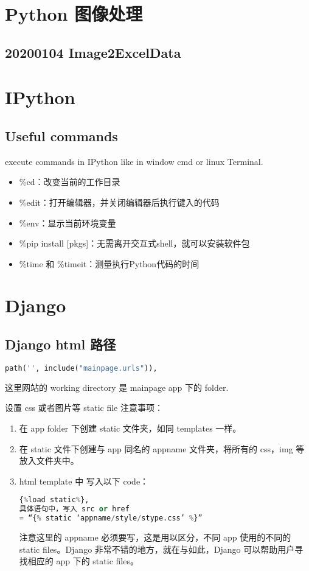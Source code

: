 \documentclass[UTF8,fancyhdr,a4paper]{ctexart}
\begin{document}
\section{Python 图像处理}
\subsection{20200104 Image2ExcelData}

\newpage
\section{IPython}
\subsection{Useful commands}
execute commands in IPython like in window cmd or linux Terminal.
\begin{itemize}
\item
\%cd：改变当前的工作目录
\item
\%edit：打开编辑器，并关闭编辑器后执行键入的代码
\item
\%env：显示当前环境变量
\item
\%pip install [pkgs]：无需离开交互式shell，就可以安装软件包
\item
\%time 和 \%timeit：测量执行Python代码的时间
\end{itemize}

\newpage
\section{Django}
\subsection{Django html 路径}
\begin{lstlisting}[language = python]
path('', include("mainpage.urls")),
\end{lstlisting}
这里网站的 working directory 是 mainpage app 下的 folder.

设置 css 或者图片等 static file 注意事项：\\
\begin{enumerate}
\item 在 app folder 下创建 static 文件夹，如同 templates 一样。
\item 在 static 文件下创建与 app 同名的 appname 文件夹，将所有的 css，img 等放入文件夹中。
\item html template 中 写入以下 code：
\begin{lstlisting}[language = python] 
{%load static%}, 
具体语句中，写入 src or href 
= “{% static ‘appname/style/stype.css’ %}”
\end{lstlisting}
注意这里的 appname 必须要写，这是用以区分，不同 app 使用的不同的 static files。Django 非常不错的地方，就在与如此，Django 可以帮助用户寻找相应的 app 下的 static files。

\end{enumerate}
\end{document}
